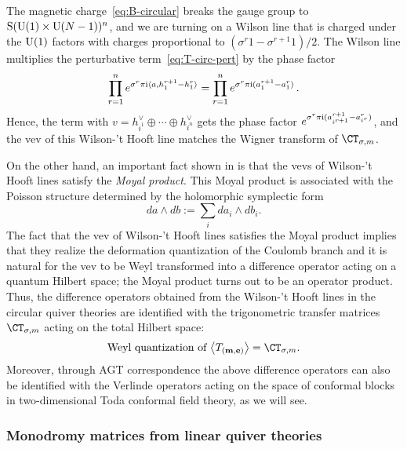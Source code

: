 The magnetic charge~\eqref{eq:B-circular} breaks the gauge group to
$\mathrm{S}(\mathrm{U}(1) \times \mathrm{U}(N-1))^n$, and we are turning on a Wilson
line that is charged under the $\mathrm{U}(1)$ factors with charges
proportional to $(\sigma^r 1 - \sigma^{r+1} 1)/2$.  The Wilson line
multiplies the perturbative term~\eqref{eq:T-circ-pert} by the phase
factor
\begin{equation}
  \prod_{r=1}^n e^{\sigma^r \pi\mathrm{i} \langle a, h^{r+1}_1 - h^r_1\rangle}
  =
  \prod_{r=1}^n e^{\sigma^r \pi\mathrm{i} (a^{r+1}_1 - a^r_1)} \,.
\end{equation}
Hence, the term with $v = h^\vee_{i^1} \oplus \dotsb \oplus h^\vee_{i^n}$ gets
the phase factor
$e^{\sigma^r \pi\mathrm{i} (a^{r+1}_{i^{r+1}} - a^r_{i^r})}$, and the vev of
this Wilson-'t Hooft line matches the Wigner transform of
$\CT_{\sigma,m}$.


On the other hand,
an important fact shown in \cite{Ito:2011ea} is that the vevs of Wilson-'t Hooft
lines satisfy the \emph{Moyal product}.
This Moyal product is
associated with the Poisson structure determined by the holomorphic
symplectic form
\begin{equation}
  da\wedge db:=\sum_{i}da_{i}\wedge db_{i}.
\end{equation}
The fact that the vev of Wilson-'t Hooft lines satisfies the Moyal product
implies that they realize the deformation quantization of the Coulomb
branch and it is natural for the vev to be Weyl
transformed into a difference operator acting on a quantum Hilbert space;
the Moyal product turns out to be an operator product.
Thus, the difference
operators obtained from the Wilson-'t Hooft lines in the circular quiver theories are
identified with the trigonometric transfer matrices $\CT_{\sigma,m}$ acting on the total
Hilbert space:
\begin{equation}
  \text{Weyl quantization of } \bigvev{T_{(\mcharge,\echarge)}}
    = \CT_{\sigma,m}.
\label{eq:WT_CT}
\end{equation}
Moreover, through
AGT correspondence the above difference operators can also be identified
with the Verlinde operators acting on the space of conformal blocks
in two-dimensional Toda conformal field theory, as we will see.





\subsubsection{Monodromy matrices from linear quiver theories}

